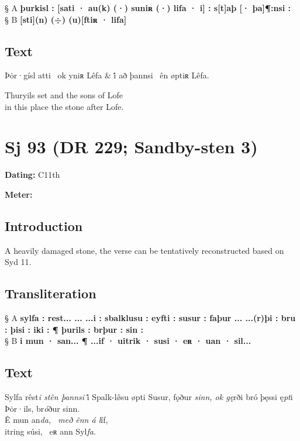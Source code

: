 § A \textbf{þurkisl : [sati · au(k) (·) suniʀ (·) lifa · i] : s[t]aþ [· þa]¶:nsi :} \\
§ B \textbf{[sti](n) (÷) (u)[ftiʀ · lifa]}

\subsection{Text}

\bvg\bva[]%
Þȯr·gísl atti \hld\ ok yniʀ Lêfa &
i̇́ að þannsi \hld\ ên øptiʀ Lêfa. \eva

\bvb Thuryils set and the sons of Lofe \\
in this place the stone after Lofe.\evb\evg

\sectionline\newpage


\section{Sj 93 (DR 229; Sandby-sten 3)}

\begin{flushright}%
\textbf{Dating:} C11th

\textbf{Meter:} \Fornyrdislag
\end{flushright}%

\subsection{Introduction}

A heavily damaged stone, the verse can be tentatively reconstructed based on Syd 11.

\subsection{Transliteration}

§ A \textbf{sylfa : rest... ... ...i : sbalklusu : eyfti : susur : faþur ... ...(r)þi : bru : þisi : iki : ¶ þurils : brþur : sin :} \\
§ B \textbf{i mun · san... ¶ ...if · uitrik · susi · eʀ · uan · sil...}

\subsection{Text}

\bpg\bpa[0]%
\startsub Sylfa rêst\emph{i stên þannsi} i̇́ Spalk-lø̂su øpti Susur, fǫður \emph{sinn, ok gę}rði bró þęssi ę\emph{pt}i Þȯr·ils, br\emph{ó}ður sinn.\endsub \\
Ê mun an\emph{da, \hld\ með ênn á l}íf, \\
itring súsi, \hld\ eʀ ann Syl\emph{fa}. \epa

